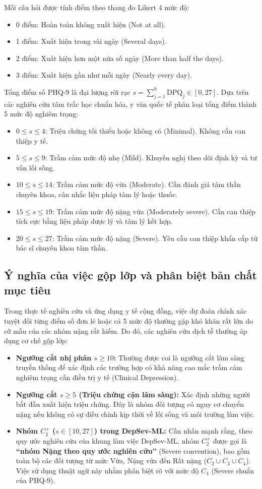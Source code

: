 Mỗi câu hỏi được tính điểm theo thang đo Likert 4 mức độ:
\begin{itemize}
    \item 0 điểm: Hoàn toàn không xuất hiện (Not at all).
    \item 1 điểm: Xuất hiện trong vài ngày (Several days).
    \item 2 điểm: Xuất hiện hơn một nửa số ngày (More than half the days).
    \item 3 điểm: Xuất hiện gần như mỗi ngày (Nearly every day).
\end{itemize}

Tổng điểm số PHQ-9 là đại lượng rời rạc $s = \sum_{j=1}^9 \text{DPQ}_j \in [0, 27]$. Dựa trên các nghiên cứu tâm trắc học chuẩn hóa, y văn quốc tế phân loại tổng điểm thành 5 mức độ nghiêm trọng:
\begin{itemize}
    \item $0 \le s \le 4$: Triệu chứng tối thiểu hoặc không có (Minimal). Không cần can thiệp y tế.
    \item $5 \le s \le 9$: Trầm cảm mức độ nhẹ (Mild). Khuyến nghị theo dõi định kỳ và tư vấn lối sống.
    \item $10 \le s \le 14$: Trầm cảm mức độ vừa (Moderate). Cần đánh giá tâm thần chuyên khoa, cân nhắc liệu pháp tâm lý hoặc thuốc.
    \item $15 \le s \le 19$: Trầm cảm mức độ nặng vừa (Moderately severe). Cần can thiệp tích cực bằng liệu pháp dược lý và tâm lý kết hợp.
    \item $20 \le s \le 27$: Trầm cảm mức độ nặng (Severe). Yêu cầu can thiệp khẩn cấp từ bác sĩ chuyên khoa tâm thần.
\end{itemize}

\subsection{Ý nghĩa của việc gộp lớp và phân biệt bản chất mục tiêu}
Trong thực tế nghiên cứu và ứng dụng y tế cộng đồng, việc dự đoán chính xác tuyệt đối từng điểm số đơn lẻ hoặc cả 5 mức độ thường gặp khó khăn rất lớn do cỡ mẫu của các nhóm nặng rất hiếm. Do đó, các nghiên cứu dịch tễ thường áp dụng cơ chế gộp lớp:
\begin{itemize}
    \item \textbf{Ngưỡng cắt nhị phân $s \ge 10$:} Thường được coi là ngưỡng cắt lâm sàng truyền thống để xác định các trường hợp có khả năng cao mắc trầm cảm nghiêm trọng cần điều trị y tế (Clinical Depression).
    \item \textbf{Ngưỡng cắt $s \ge 5$ (Triệu chứng cận lâm sàng):} Xác định những người bắt đầu xuất hiện triệu chứng. Đây là nhóm đối tượng có nguy cơ chuyển nặng nếu không có sự điều chỉnh kịp thời về lối sống và môi trường làm việc.
    \item \textbf{Nhóm $C_2^+$ ($s \in [10, 27]$) trong DepSev-ML:} Cần nhấn mạnh rằng, theo quy ước nghiên cứu của khung làm việc DepSev-ML, nhóm $C_2^+$ được gọi là \textbf{“nhóm Nặng theo quy ước nghiên cứu”} (Severe convention), bao gồm toàn bộ các đối tượng từ mức Vừa, Nặng vừa đến Rất nặng ($C_2 \cup C_3 \cup C_4$). Việc sử dụng thuật ngữ này nhằm phân biệt rõ với mức độ $C_4$ (Severe chuẩn của PHQ-9).
\end{itemize}

